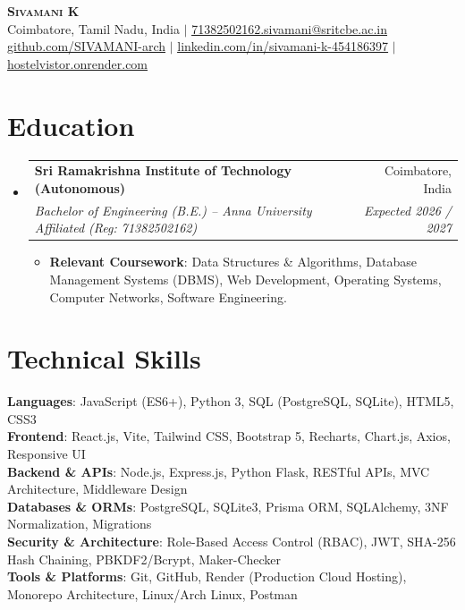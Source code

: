 \documentclass[letterpaper,11pt]{article}
\makeatletter
\newcommand{\resumeItem}[1]{
  \item\small{
    {#1 \vspace{-2pt}}
  }
}
\newcommand{\resumeSubheading}[4]{
  \vspace{-2pt}\item
    \begin{tabular*}{0.97\textwidth}[t]{l@{\extracolsep{\fill}}r}
      \textbf{#1} & #2 \\
      \textit{\small#3} & \textit{\small #4} \\
    \end{tabular*}\vspace{-7pt}
}
\newcommand{\resumeSubHeadingListStart}{\begin{itemize}[leftmargin=0.15in, label={}]}
\newcommand{\resumeSubHeadingListEnd}{\end{itemize}}
\newcommand{\resumeItemListStart}{\begin{itemize}}
\newcommand{\resumeItemListEnd}{\end{itemize}\vspace{-5pt}}
\makeatother
\begin{document}
\begin{center}
    \textbf{\Huge \scshape Sivamani K} \\ \vspace{2pt}
    \small Coimbatore, Tamil Nadu, India $|$ \href{mailto:71382502162.sivamani@sritcbe.ac.in}{\underline{71382502162.sivamani@sritcbe.ac.in}} \\
    \href{https://github.com/SIVAMANI-arch}{\underline{github.com/SIVAMANI-arch}} $|$
    \href{https://www.linkedin.com/in/sivamani-k-454186397/}{\underline{linkedin.com/in/sivamani-k-454186397}} $|$
    \href{https://hostelvistor.onrender.com/login}{\underline{hostelvistor.onrender.com}}
\end{center}

\section{Education}
  \resumeSubHeadingListStart
    \resumeSubheading
      {Sri Ramakrishna Institute of Technology (Autonomous)}{Coimbatore, India}
      {Bachelor of Engineering (B.E.) -- Anna University Affiliated (Reg: 71382502162)}{Expected 2026 / 2027}
      \resumeItemListStart
        \resumeItem{\textbf{Relevant Coursework}: Data Structures \& Algorithms, Database Management Systems (DBMS), Web Development, Operating Systems, Computer Networks, Software Engineering.}
      \resumeItemListEnd
  \resumeSubHeadingListEnd

\section{Technical Skills}
 \begin{itemize}[leftmargin=0.15in, label={}]
    \small{\item{
     \textbf{Languages}{: JavaScript (ES6+), Python 3, SQL (PostgreSQL, SQLite), HTML5, CSS3} \\
     \textbf{Frontend}{: React.js, Vite, Tailwind CSS, Bootstrap 5, Recharts, Chart.js, Axios, Responsive UI} \\
     \textbf{Backend \& APIs}{: Node.js, Express.js, Python Flask, RESTful APIs, MVC Architecture, Middleware Design} \\
     \textbf{Databases \& ORMs}{: PostgreSQL, SQLite3, Prisma ORM, SQLAlchemy, 3NF Normalization, Migrations} \\
     \textbf{Security \& Architecture}{: Role-Based Access Control (RBAC), JWT, SHA-256 Hash Chaining, PBKDF2/Bcrypt, Maker-Checker} \\
     \textbf{Tools \& Platforms}{: Git, GitHub, Render (Production Cloud Hosting), Monorepo Architecture, Linux/Arch Linux, Postman}
    }}
 \end{itemize}
\end{document}
